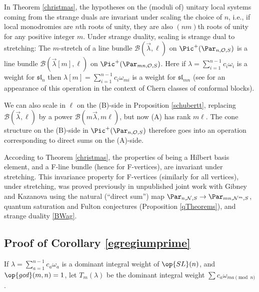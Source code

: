 \begin{remark}
\notready\label{stretch2}
In Theorem \ref{christmas}, the hypotheses on the (moduli of) unitary local systems coming from the strange duals are invariant under scaling the choice of $n$, i.e., if local monodromies are $n$th roots of unity, they are also $(nm)$th roots of unity for any positive integer $m$. Under strange duality, scaling is strange dual to stretching: The $m$-stretch of a line bundle
$\mathcal{B}(\vec{\lambda},\ell)$ on  $\Pic^+(\Par_{n,\mathcal{O},S})$ is a line bundle $\mathcal{B}(\vec{\lambda}[m],\ell)$ on  $\Pic^+(\Par_{mn,\mathcal{O},S})$. Here if $\lambda=\sum_{i=1}^{n-1}  c_i\omega_i$ is a weight for $\mathfrak{sl}_n$ then $\lambda[m] = \sum_{i=1}^{n-1}  c_i\omega_{mi}$ is a weight for $\mathfrak{sl}_{mn}$  (see \cite[Prop 1.3]{GG} for an appearance of this operation in the context of Chern classes of conformal blocks).

We can also scale in $\ell$ on the (B)-side in Proposition \ref{schubertt}, replacing $\mathcal{B}(\vec{\lambda},\ell)$ by a power $\mathcal{B}(m\vec{\lambda},m\ell)$, but now (A) has rank
$m\ell$. The cone structure on the (B)-side in $\Pic^+(\Par_{n,\mathcal{O},S})$ therefore goes into an operation corresponding to direct sums on the (A)-side.

According to Theorem \ref{christmas}, the properties of being a Hilbert basis element, and a F-line bundle (hence for F-vertices), are invariant under stretching. This invariance property for F-vertices (similarly for all vertices), under stretching,  was proved previously in unpublished joint work with  Gibney and Kazanova using the natural (``direct sum'') map $\Par_{n,\mathcal{N},S}\to \Par_{mn,\mathcal{N}^m,S}$, quantum saturation and Fulton conjectures (Proposition   \ref{qTheorems}), and strange duality \ref{BWag}.
\end{remark}

\subsection{Proof of Corollary \ref{egregiumprime}}
\begin{defi}
\notready\label{aliB}
If $\lambda=\sum_{a=1}^{n-1} c_a\omega_a$ is a dominant integral weight of $\op{SL}(n)$, and $\op{gcd}(m,n)=1$, let $T_m(\lambda)$ be the dominant integral weight $\sum c_a\omega_{ma \pmod{n}}$.
\end{defi}

